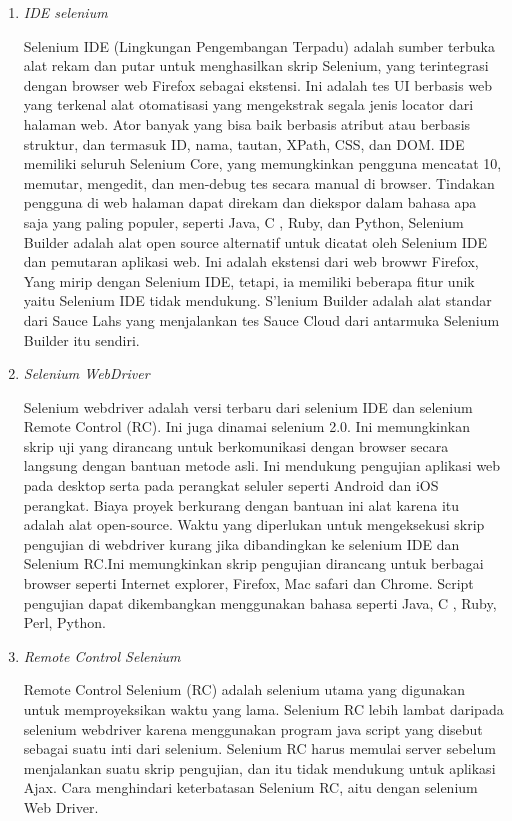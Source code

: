\begin{enumerate}

\item \textit{IDE selenium}
\par Selenium IDE (Lingkungan Pengembangan Terpadu) adalah sumber terbuka alat rekam dan putar untuk menghasilkan skrip Selenium, yang terintegrasi dengan browser web Firefox sebagai ekstensi. Ini adalah tes UI berbasis web yang terkenal alat otomatisasi yang mengekstrak segala jenis locator dari halaman web. Ator banyak yang bisa baik berbasis atribut atau berbasis struktur, dan termasuk ID, nama, tautan, XPath, CSS, dan DOM. IDE memiliki seluruh Selenium Core, yang memungkinkan pengguna mencatat 10, memutar, mengedit, dan men-debug tes secara manual di browser. Tindakan pengguna di web halaman dapat direkam dan diekspor dalam bahasa apa saja yang paling populer, seperti Java, C , Ruby, dan Python, Selenium Builder adalah alat open source alternatif untuk dicatat oleh Selenium IDE dan pemutaran aplikasi web. Ini adalah ekstensi dari web browwr Firefox, Yang mirip dengan Selenium IDE, tetapi, ia memiliki beberapa fitur unik yaitu Selenium IDE tidak mendukung. S'lenium Builder adalah alat standar dari Sauce Lahs yang menjalankan tes Sauce Cloud dari antarmuka Selenium Builder itu sendiri.

\item \textit{Selenium WebDriver}
\par Selenium webdriver adalah versi terbaru dari selenium IDE dan selenium Remote Control (RC). Ini juga dinamai selenium 2.0. Ini memungkinkan skrip uji yang dirancang untuk berkomunikasi dengan browser secara langsung dengan bantuan metode asli. Ini mendukung pengujian aplikasi web pada desktop serta pada perangkat seluler seperti Android dan iOS
perangkat. Biaya proyek berkurang dengan bantuan ini alat karena itu adalah alat open-source. Waktu yang diperlukan untuk mengeksekusi skrip pengujian di webdriver kurang jika dibandingkan ke selenium IDE dan Selenium RC.Ini memungkinkan skrip pengujian dirancang untuk berbagai browser seperti Internet explorer, Firefox, Mac safari dan Chrome. Script pengujian dapat dikembangkan menggunakan bahasa seperti Java, C , Ruby, Perl, Python.


\item \textit{Remote Control Selenium}
\par Remote Control Selenium (RC) adalah selenium utama yang digunakan untuk memproyeksikan waktu yang lama. Selenium RC lebih lambat daripada selenium webdriver karena menggunakan program java script yang disebut sebagai suatu inti dari selenium. Selenium RC harus memulai server sebelum menjalankan suatu skrip pengujian, dan itu tidak mendukung untuk aplikasi Ajax. Cara menghindari keterbatasan Selenium RC, aitu dengan selenium Web Driver.


\end{enumerate}

